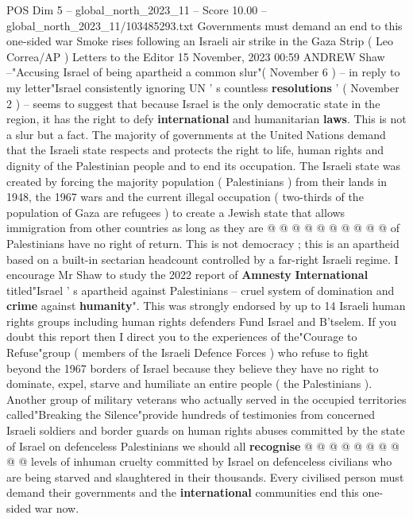 \begin{textsample}{POS Dim 5 – global\_north\_2023\_11 – Score 10.00 – global\_north\_2023\_11/103485293.txt}  \label{ex:f5_pos_413}
Governments must demand an end to this one-sided war Smoke rises following an Israeli air strike in the Gaza Strip ( Leo Correa/AP ) Letters to the Editor 15 November, 2023 00:59 ANDREW Shaw --"Accusing Israel of being apartheid a common slur"( November 6 ) -- in reply to my letter"Israel consistently ignoring UN ' s countless \textbf{resolutions} ' ( November 2 ) -- seems to suggest that because Israel is the only democratic state in the region, it has the right to defy \textbf{international} and humanitarian \textbf{laws}.
This is not a slur but a fact.
The majority of governments at the United Nations demand that the Israeli state respects and protects the right to life, human rights and dignity of the Palestinian people and to end its occupation.
The Israeli state was created by forcing the majority population ( Palestinians ) from their lands in 1948, the 1967 wars and the current illegal occupation ( two-thirds of the population of Gaza are refugees ) to create a Jewish state that allows immigration from other countries as long as they are @ @ @ @ @ @ @ @ @ @ of Palestinians have no right of return.
This is not democracy ; this is an apartheid based on a built-in sectarian headcount controlled by a far-right Israeli regime.
I encourage Mr Shaw to study the 2022 report of \textbf{Amnesty} \textbf{International} titled"Israel ' s apartheid against Palestinians -- cruel system of domination and \textbf{crime} against \textbf{humanity}".
This was strongly endorsed by up to 14 Israeli human rights groups including human rights defenders Fund Israel and B'tselem.
If you doubt this report then I direct you to the experiences of the"Courage to Refuse"group ( members of the Israeli Defence Forces ) who refuse to fight beyond the 1967 borders of Israel because they believe they have no right to dominate, expel, starve and humiliate an entire people ( the Palestinians ).
Another group of military veterans who actually served in the occupied territories called"Breaking the Silence"provide hundreds of testimonies from concerned Israeli soldiers and border guards on human rights abuses committed by the state of Israel on defenceless Palestinians we should all \textbf{recognise} @ @ @ @ @ @ @ @ @ @ levels of inhuman cruelty committed by Israel on defenceless civilians who are being starved and slaughtered in their thousands.
Every civilised person must demand their governments and the \textbf{international} communities end this one-sided war now.

\end{textsample}
